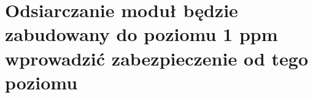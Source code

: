 \section{Odsiarczanie moduł będzie zabudowany do poziomu 1 ppm wprowadzić
zabezpieczenie od tego poziomu }
